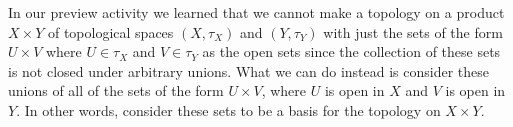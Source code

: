 \begin{comment}

\ActivitySolution

\be
\item  We take all products of open sets in $X$ and $Y$ to obtain the basis elements
\begin{align*}
\emptyset & \\
\{a\} \times \{1\} &= \{(a,1)\} \\
\{a\} \times Y &= \{(a,1), (a,2)\} \\
\{b\} \times \{1\} &= \{(b,1)\} \\
\{b\} \times Y &= \{(b,1), (b,2)\} \\
\{a,b\} \times \{1\} &= \{(a,1), (b,1)\} \\
\{a,b\} \times Y &= \{(a,1), (a,2), (b,1), (b,2)\} \\
\{a,c\} \times \{1\} &= \{(a,1), (c,1)\} \\
\{a,c\} \times Y &= &= \{(a,1), (a,2), (c,1), (c,2)\}
X \times \{1\} &= \{(a,1), (b,1), (c,1)\} \\
X \times Y &= \{(a,1), (a,2), (b,1), (b,2), (c,1), (c,2)\}.
\end{align*}

 
\item  We have $A = (\{a\} \times Y) \cup (\{b\} \times \{1\})$, so $A$ is a union of open sets in $X \times Y$ and should be open. But $A$ is not of the form $U \times V$ for some open sets $U$ in $X$ and $V$ in $Y$, as it is not in the list of those sets in part (a). 


\item Since $\CB$ is not closed under unions, $\B$ is not a topology on $X \times Y$. However, if we consider all of the unions and finite intersections of sets in $\B$ we create the topology 
\[\{\emptyset, \{(a,1)\}, \{(b,1)\}, \{(a,1), (a,2)\}, \{(b,1), (b,2)\}, \{(a,1), (b,1)\}, \{(a,1), (c,1)\}, \{(a,1), (b,1), (b,2)\}, \{(a,1), (a,2), (b,1)\}, \{(a,1), (a,2), (c,1)\},  \{(a,1), (b,1), (c,1)\}, \{(a,1), (a,2), (b,1), (c,1)\}, \{(a,1), (b,1), (b,2), (c,1)\}, \{(a,1), (a,2), (b,1), (b,2)\}, \{(a,1), (a,2), (b,1), (b,2), (c,1)\}, X \times Y\}\]
on $X \times Y$. In other words, we consider $\CB$ a basis for a topology of $X \times Y$. 

\ee

\end{comment}


 \label{sec_box_prod_top}

In our preview activity we learned that we cannot make a topology on a product $X \times Y$ of topological spaces $(X, \tau_X)$ and $(Y , \tau_Y)$ with just the sets of the form $U \times V$ where $U \in \tau_X$ and $V \in \tau_Y$ as the open sets since the collection of these sets is not closed under arbitrary unions. What we can do instead is consider these unions of all of the sets of the form $U \times V$, where $U$ is open in $X$ and $V$ is open in $Y$. In other words, consider these sets to be a basis for the topology on $X \times Y$. 

